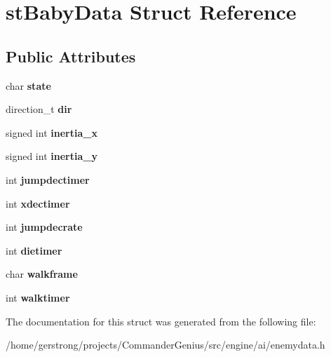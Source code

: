 \hypertarget{structst_baby_data}{
\section{stBabyData Struct Reference}
\label{structst_baby_data}
}
\subsection*{Public Attributes}
\begin{DoxyCompactItemize}
\item 
\hypertarget{structst_baby_data_ae0b0559230a93c2368936767619b2592}{
char {\bfseries state}}
\label{structst_baby_data_ae0b0559230a93c2368936767619b2592}

\item 
\hypertarget{structst_baby_data_ace96386de6a75e06fd03ed2ddf391671}{
direction\_\-t {\bfseries dir}}
\label{structst_baby_data_ace96386de6a75e06fd03ed2ddf391671}

\item 
\hypertarget{structst_baby_data_a0cba62c638e26dcc26c708ca9fdc76a6}{
signed int {\bfseries inertia\_\-x}}
\label{structst_baby_data_a0cba62c638e26dcc26c708ca9fdc76a6}

\item 
\hypertarget{structst_baby_data_a677aa55e13c12eab22139425c4adc11e}{
signed int {\bfseries inertia\_\-y}}
\label{structst_baby_data_a677aa55e13c12eab22139425c4adc11e}

\item 
\hypertarget{structst_baby_data_ad3db7a16fdee848e7639fa29b51cef7e}{
int {\bfseries jumpdectimer}}
\label{structst_baby_data_ad3db7a16fdee848e7639fa29b51cef7e}

\item 
\hypertarget{structst_baby_data_ad4d8def26af8cd9f2bf3592bd8f4760e}{
int {\bfseries xdectimer}}
\label{structst_baby_data_ad4d8def26af8cd9f2bf3592bd8f4760e}

\item 
\hypertarget{structst_baby_data_a6bc3210a8e5b9debe5c7b8d890cd1d2a}{
int {\bfseries jumpdecrate}}
\label{structst_baby_data_a6bc3210a8e5b9debe5c7b8d890cd1d2a}

\item 
\hypertarget{structst_baby_data_affd79cd7538aaea318fcb28c4e2f56c7}{
int {\bfseries dietimer}}
\label{structst_baby_data_affd79cd7538aaea318fcb28c4e2f56c7}

\item 
\hypertarget{structst_baby_data_ae58395920cb51bc3700de1a060736140}{
char {\bfseries walkframe}}
\label{structst_baby_data_ae58395920cb51bc3700de1a060736140}

\item 
\hypertarget{structst_baby_data_afd88e48117df4719c7b6fd592d2bfd3f}{
int {\bfseries walktimer}}
\label{structst_baby_data_afd88e48117df4719c7b6fd592d2bfd3f}

\end{DoxyCompactItemize}


The documentation for this struct was generated from the following file:\begin{DoxyCompactItemize}
\item 
/home/gerstrong/projects/CommanderGenius/src/engine/ai/enemydata.h\end{DoxyCompactItemize}
